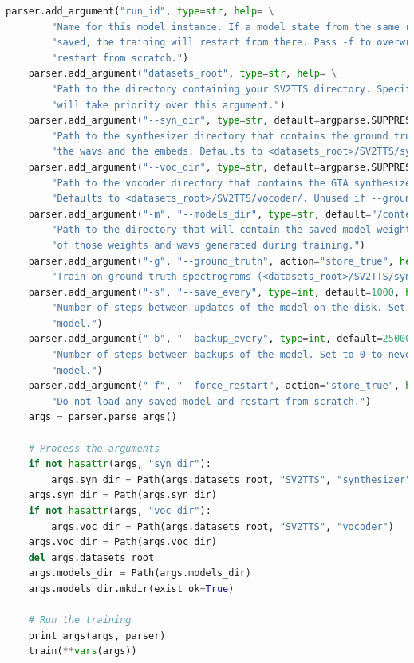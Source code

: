 \begin{enumerate}
\begin{lstlisting}[language=Python, caption=Vocoder Train (Pycharm)]
    parser.add_argument("run_id", type=str, help= \
        "Name for this model instance. If a model state from the same run ID was previously "
        "saved, the training will restart from there. Pass -f to overwrite saved states and "
        "restart from scratch.")
    parser.add_argument("datasets_root", type=str, help= \
        "Path to the directory containing your SV2TTS directory. Specifying --syn_dir or --voc_dir "
        "will take priority over this argument.")
    parser.add_argument("--syn_dir", type=str, default=argparse.SUPPRESS, help= \
        "Path to the synthesizer directory that contains the ground truth mel spectrograms, "
        "the wavs and the embeds. Defaults to <datasets_root>/SV2TTS/synthesizer/.")
    parser.add_argument("--voc_dir", type=str, default=argparse.SUPPRESS, help= \
        "Path to the vocoder directory that contains the GTA synthesized mel spectrograms. "
        "Defaults to <datasets_root>/SV2TTS/vocoder/. Unused if --ground_truth is passed.")
    parser.add_argument("-m", "--models_dir", type=str, default="/content/drive/MyDrive/ColabNotebooks/Real-Time-Voice-Cloning/vocoder/saved_models/", help=\
        "Path to the directory that will contain the saved model weights, as well as backups "
        "of those weights and wavs generated during training.")
    parser.add_argument("-g", "--ground_truth", action="store_true", help= \
        "Train on ground truth spectrograms (<datasets_root>/SV2TTS/synthesizer/mels).")
    parser.add_argument("-s", "--save_every", type=int, default=1000, help= \
        "Number of steps between updates of the model on the disk. Set to 0 to never save the "
        "model.")
    parser.add_argument("-b", "--backup_every", type=int, default=25000, help= \
        "Number of steps between backups of the model. Set to 0 to never make backups of the "
        "model.")
    parser.add_argument("-f", "--force_restart", action="store_true", help= \
        "Do not load any saved model and restart from scratch.")
    args = parser.parse_args()

    # Process the arguments
    if not hasattr(args, "syn_dir"):
        args.syn_dir = Path(args.datasets_root, "SV2TTS", "synthesizer")
    args.syn_dir = Path(args.syn_dir)
    if not hasattr(args, "voc_dir"):
        args.voc_dir = Path(args.datasets_root, "SV2TTS", "vocoder")
    args.voc_dir = Path(args.voc_dir)
    del args.datasets_root
    args.models_dir = Path(args.models_dir)
    args.models_dir.mkdir(exist_ok=True)

    # Run the training
    print_args(args, parser)
    train(**vars(args))
    

\end{lstlisting}
\end{enumerate}
